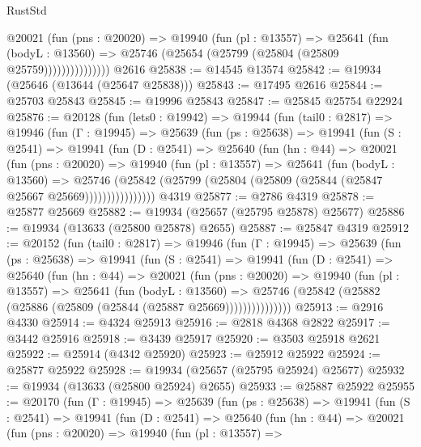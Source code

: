 \begin{lexlean}{RustStd}
\begin{coremodule}
                  @20021
                    (fun (pns : @20020) =>
                    @19940
                      (fun (pl : @13557) =>
                      @25641
                        (fun (bodyL : @13560) =>
                        @25746 (@25654 (@25799 (@25804 (@25809 @25759)))))))))))))))
    @2616
@25838 := @14545 @13574
@25842 := @19934 (@25646 (@13644 (@25647 @25838)))
@25843 := @17495 @2616
@25844 := @25703 @25843
@25845 := @19996 @25843
@25847 := @25845 @25754 @22924
@25876 := @20128
    (fun (lets0 : @19942) =>
    @19944
      (fun (tail0 : @2817) =>
      @19946
        (fun (Γ : @19945) =>
        @25639
          (fun (ps : @25638) =>
          @19941
            (fun (S : @2541) =>
            @19941
              (fun (D : @2541) =>
              @25640
                (fun (hn : @44) =>
                @20021
                  (fun (pns : @20020) =>
                  @19940
                    (fun (pl : @13557) =>
                    @25641
                      (fun (bodyL : @13560) =>
                      @25746
                        (@25842
                          (@25799 (@25804 (@25809 (@25844 (@25847 @25667 @25669))))))))))))))))
    @4319
@25877 := @2786 @4319
@25878 := @25877 @25669
@25882 := @19934 (@25657 (@25795 @25878) @25677)
@25886 := @19934 (@13633 (@25800 @25878) @2655)
@25887 := @25847 @4319
@25912 := @20152
    (fun (tail0 : @2817) =>
    @19946
      (fun (Γ : @19945) =>
      @25639
        (fun (ps : @25638) =>
        @19941
          (fun (S : @2541) =>
          @19941
            (fun (D : @2541) =>
            @25640
              (fun (hn : @44) =>
              @20021
                (fun (pns : @20020) =>
                @19940
                  (fun (pl : @13557) =>
                  @25641
                    (fun (bodyL : @13560) =>
                    @25746 (@25842 (@25882 (@25886 (@25809 (@25844 (@25887 @25669)))))))))))))))
@25913 := @2916 @4330
@25914 := @4324 @25913
@25916 := @2818 @4368 @2822
@25917 := @3442 @25916
@25918 := @3439 @25917
@25920 := @3503 @25918 @2621
@25922 := @25914 (@4342 @25920)
@25923 := @25912 @25922
@25924 := @25877 @25922
@25928 := @19934 (@25657 (@25795 @25924) @25677)
@25932 := @19934 (@13633 (@25800 @25924) @2655)
@25933 := @25887 @25922
@25955 := @20170
    (fun (Γ : @19945) =>
    @25639
      (fun (ps : @25638) =>
      @19941
        (fun (S : @2541) =>
        @19941
          (fun (D : @2541) =>
          @25640
            (fun (hn : @44) =>
            @20021
              (fun (pns : @20020) =>
              @19940
                (fun (pl : @13557) =>

\end{coremodule}
\end{lexlean}
